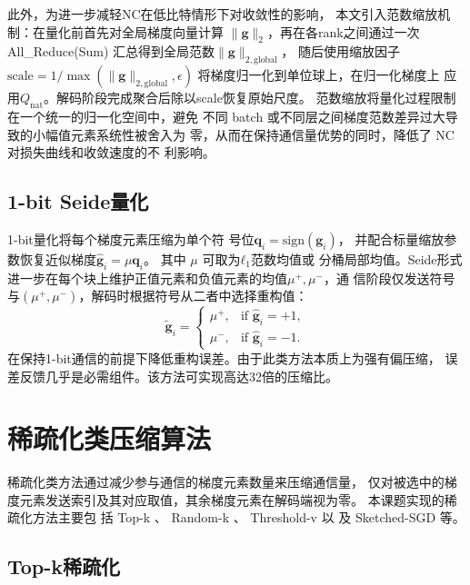 此外，为进一步减轻NC在低比特情形下对收敛性的影响，
本文引入范数缩放机制：在量化前首先对全局梯度向量计算
$\|\mathbf{g}\|_2$，再在各rank之间通过一次 All\_Reduce(Sum) 
汇总得到全局范数$\|\mathbf{g}\|_{2,\text{global}}$，
随后使用缩放因子$\text{scale} = 1/\max(\|\mathbf{g}\|_{2,\text{global}}, \epsilon)$
将梯度归一化到单位球上，在归一化梯度上
应用$Q_{\text{nat}}$。解码阶段完成聚合后除以scale恢复原始尺度。
范数缩放将量化过程限制在一个统一的归一化空间中，避免
不同 batch 或不同层之间梯度范数差异过大导致的小幅值元素系统性被舍入为
零，从而在保持通信量优势的同时，降低了 NC 对损失曲线和收敛速度的不
利影响。

\subsection{1-bit Seide量化}

1-bit量化将每个梯度元素压缩为单个符
号位$\mathbf{q}_i = \text{sign}(\mathbf{g}_i)$，
并配合标量缩放参数恢复近似梯度$\hat{\mathbf{g}}_i = \mu\mathbf{q}_i$。
其中 $\mu$ 可取为$ℓ_1$范数均值或
分桶局部均值。Seide形式\cite{seide2014onebit}
进一步在每个块上维护正值元素和负值元素的均值$\mu^+, \mu^-$，通
信阶段仅发送符号与$(\mu^+, \mu^-)$，解码时根据符号从二者中选择重构值：
\begin{equation}
\tilde{\mathbf{g}}_i = \begin{cases}
\mu^+, & \text{if~} \hat{\mathbf{g}}_i = +1, \\
\mu^-, & \text{if~} \hat{\mathbf{g}}_i = -1.
\end{cases}
\label{eq:onebit-seide}
\end{equation}
在保持1-bit通信的前提下降低重构误差。由于此类方法本质上为强有偏压缩，
误差反馈几乎是必需组件。该方法可实现高达32倍的压缩比。

\section{稀疏化类压缩算法}

稀疏化类方法通过减少参与通信的梯度元素数量来压缩通信量，
仅对被选中的梯度元素发送索引及其对应取值，其余梯度元素在解码端视为零。
本课题实现的稀疏化方法主要包 括 Top-k 、 Random-k 、 Threshold-v 以 及
Sketched-SGD 等。

\subsection{Top-k稀疏化}

